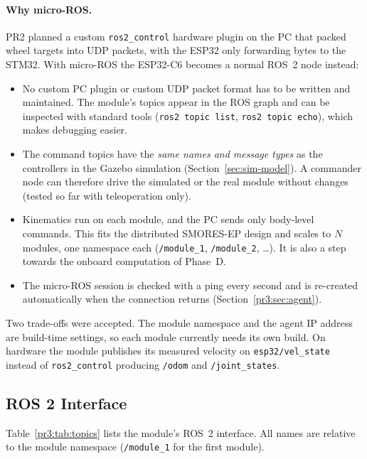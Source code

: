 \documentclass[12pt,a4paper]{article}
\begin{document}
\paragraph{Why micro-ROS.} PR2 planned a custom \texttt{ros2\_control} hardware plugin on the
PC that packed wheel targets into UDP packets, with the ESP32 only forwarding bytes to the
STM32. With micro-ROS the ESP32-C6 becomes a normal ROS~2 node instead:
\begin{itemize}
  \item No custom PC plugin or custom UDP packet format has to be written and maintained.
        The module's topics appear in the ROS graph and can be inspected with standard tools
        (\texttt{ros2 topic list}, \texttt{ros2 topic echo}), which makes debugging easier.
  \item The command topics have the \emph{same names and message types} as the controllers in
        the Gazebo simulation (Section~\ref{sec:sim-model}). A commander node can therefore drive the simulated or the real
        module without changes (tested so far with teleoperation only).
  \item Kinematics run on each module, and the PC sends only body-level commands. This fits
        the distributed SMORES-EP design and scales to $N$ modules, one namespace each
        (\texttt{/module\_1}, \texttt{/module\_2}, \dots). It is also a step towards the onboard
        computation of Phase~D.
  \item The micro-ROS session is checked with a ping every second and is re-created
        automatically when the connection returns (Section~\ref{pr3:sec:agent}).
\end{itemize}
Two trade-offs were accepted. The module namespace and the agent IP address are build-time
settings, so each module currently needs its own build. On hardware the module publishes its
measured velocity on \texttt{esp32/vel\_state} instead of \texttt{ros2\_control} producing
\texttt{/odom} and \texttt{/joint\_states}.

\subsection{ROS 2 Interface}

Table~\ref{pr3:tab:topics} lists the module's ROS~2 interface. All names are relative to the
module namespace (\texttt{/module\_1} for the first module).
\end{document}
